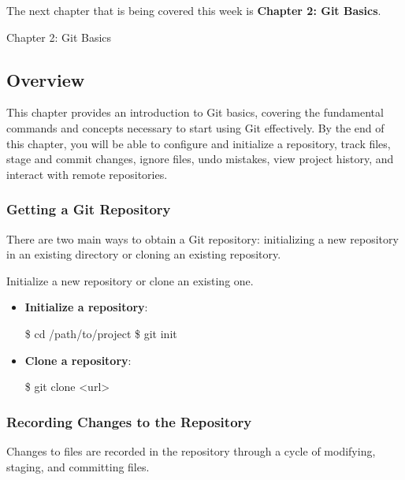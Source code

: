 The next chapter that is being covered this week is \textbf{Chapter 2: Git Basics}.

\begin{notes}{Chapter 2: Git Basics}
    \subsection*{Overview}

    This chapter provides an introduction to Git basics, covering the fundamental commands and concepts necessary to start using Git effectively. By the end of this chapter, you will be able to configure and initialize a repository, track files, stage and commit changes, ignore files, undo mistakes, view project history, and interact with remote repositories.
    
    \subsubsection*{Getting a Git Repository}
    
    There are two main ways to obtain a Git repository: initializing a new repository in an existing directory or cloning an existing repository.
    
    \begin{highlight}
    
        Initialize a new repository or clone an existing one.
        
        \begin{itemize}
            \item \textbf{Initialize a repository}:
    \begin{code}[Bash]
    \$ cd /path/to/project
    \$ git init
    \end{code}
            \item \textbf{Clone a repository}:
    \begin{code}[Bash]
    \$ git clone <url>
    \end{code}
        \end{itemize}
    
    \end{highlight}
    
    \subsubsection*{Recording Changes to the Repository}
    
    Changes to files are recorded in the repository through a cycle of modifying, staging, and committing files.
    

\end{notes}
